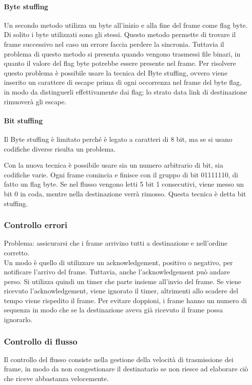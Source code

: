 \paragraph{Byte stuffing}
Un secondo metodo utilizza un byte all'inizio e alla fine del frame come flag byte.
Di solito i byte utilizzati sono gli stessi.
Questo metodo permette di trovare il frame successivo nel caso un errore faccia perdere la sincronia.
Tuttavia il problema di questo metodo si presenta quando vengono trasmessi file binari, in quanto il valore del flag byte potrebbe essere presente nel frame.
Per risolvere questo problema è possibile usare la tecnica del Byte stuffing,
ovvero viene inserito un carattere di escape prima di ogni occorrenza nel frame del byte flag, in modo da distinguerli effettivamente dai flag;
lo strato data link di destinazione rimuoverà gli escape.

\paragraph{Bit stuffing}
Il Byte stuffing è limitato perché è legato a caratteri di 8 bit, ma se si usano codifiche diverse risulta un problema.

Con la nuova tecnica è possibile usare sia un numero arbitrario di bit, sia codifiche varie.
Ogni frame comincia e finisce con il gruppo di bit 01111110, di fatto un flag byte. 
Se nel flusso vengono letti 5 bit 1 consecutivi, viene messo un bit 0 in coda, mentre nella destinazione verrà rimosso.
Questa tecnica è detta bit stuffing.

\subsubsection{Controllo errori}
Problema: assicurarsi che i frame arrivino tutti a destinazione e nell'ordine corretto.\\
Un modo è quello di utilizzare un acknowledgement, positivo o negativo, per notificare l'arrivo del frame.
Tuttavia, anche l'acknowledgement può andare perso. Si utilizza quindi un timer che parte insieme all'invio del frame.
Se viene ricevuto l'acknowledgement, viene ignorato il timer, altrimenti allo scadere del tempo viene rispedito il frame.
Per evitare doppioni, i frame hanno un numero di sequenza in modo che se la destinazione aveva già ricevuto il frame possa ignorarlo.

\subsubsection{Controllo di flusso}
Il controllo del flusso consiste nella gestione della velocità di trasmissione dei frame,
in modo da non congestionare il destinatario se non riesce ad elaborare ciò che riceve abbastanza velocemente.

